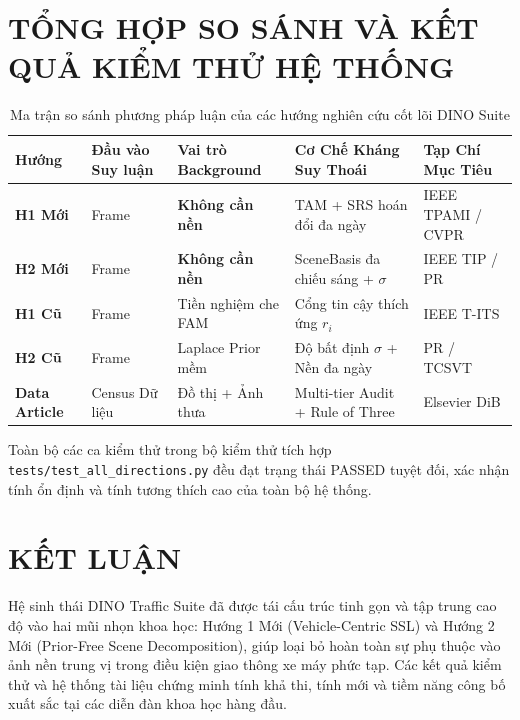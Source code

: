\documentclass[11pt,a4paper]{article}
\begin{document}
\section{TỔNG HỢP SO SÁNH VÀ KẾT QUẢ KIỂM THỬ HỆ THỐNG}

\begin{table}[htbp]
\centering
\small
\caption{Ma trận so sánh phương pháp luận của các hướng nghiên cứu cốt lõi DINO Suite}
\label{tab:matrix}
\begin{tabular}{>{\raggedright\arraybackslash}p{2.2cm} >{\raggedright\arraybackslash}p{2.5cm} >{\raggedright\arraybackslash}p{3.2cm} >{\raggedright\arraybackslash}p{4.5cm} >{\raggedright\arraybackslash}p{2.6cm}}
\toprule
\textbf{Hướng} & \textbf{Đầu vào Suy luận} & \textbf{Vai trò Background} & \textbf{Cơ Chế Kháng Suy Thoái} & \textbf{Tạp Chí Mục Tiêu} \\
\midrule
\textbf{H1 Mới} & 1 Frame & \textbf{Không cần nền} & TAM + SRS hoán đổi đa ngày & IEEE TPAMI / CVPR \\
\addlinespace
\textbf{H2 Mới} & 1 Frame & \textbf{Không cần nền} & SceneBasis đa chiếu sáng + $\sigma$ & IEEE TIP / PR \\
\addlinespace
\textbf{H1 Cũ} & 1 Frame & Tiền nghiệm che FAM & Cổng tin cậy thích ứng $r_i$ & IEEE T-ITS \\
\addlinespace
\textbf{H2 Cũ} & 1 Frame & Laplace Prior mềm & Độ bất định $\sigma$ + Nền đa ngày & PR / TCSVT \\
\addlinespace
\textbf{Data Article} & Census Dữ liệu & Đồ thị + Ảnh thưa & Multi-tier Audit + Rule of Three & Elsevier DiB \\
\bottomrule
\end{tabular}
\end{table}

Toàn bộ các ca kiểm thử trong bộ kiểm thử tích hợp \texttt{tests/test\_all\_directions.py} đều đạt trạng thái PASSED tuyệt đối, xác nhận tính ổn định và tính tương thích cao của toàn bộ hệ thống.

\section{KẾT LUẬN}
Hệ sinh thái DINO Traffic Suite đã được tái cấu trúc tinh gọn và tập trung cao độ vào hai mũi nhọn khoa học: Hướng 1 Mới (Vehicle-Centric SSL) và Hướng 2 Mới (Prior-Free Scene Decomposition), giúp loại bỏ hoàn toàn sự phụ thuộc vào ảnh nền trung vị trong điều kiện giao thông xe máy phức tạp. Các kết quả kiểm thử và hệ thống tài liệu chứng minh tính khả thi, tính mới và tiềm năng công bố xuất sắc tại các diễn đàn khoa học hàng đầu.
\end{document}
